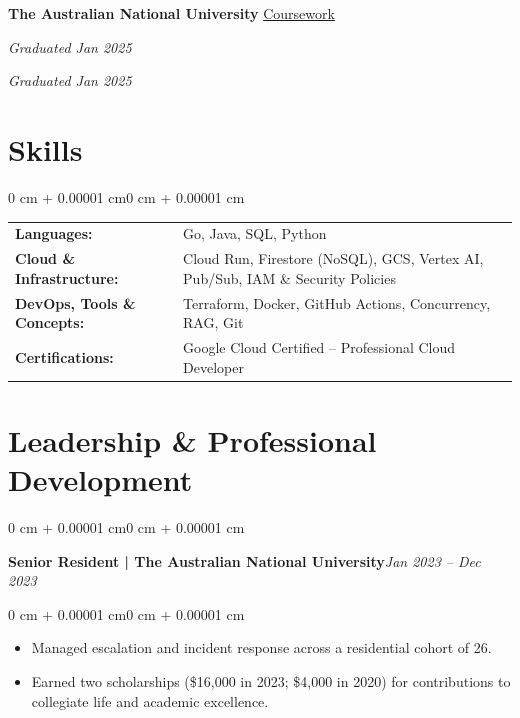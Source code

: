 \documentclass[10pt, letterpaper]{article}
\newenvironment{highlights}{
    \begin{itemize}[
        topsep=0.10 cm,
        parsep=0.10 cm,
        partopsep=0pt,
        itemsep=0pt,
        leftmargin=0 cm + 10pt
    ]
}{
    \end{itemize}
}
\newenvironment{onecolentry}{
    \begin{adjustwidth}{0 cm + 0.00001 cm}{0 cm + 0.00001 cm}
}{
    \end{adjustwidth}
}
\let\hrefWithoutArrow\href
\begin{document}
\textbf{The Australian National University}\hfill{} \hrefWithoutArrow{https://gitlab.com/llllllllleong/my-individual-works}{Coursework}%


\vspace{0.1cm}

\hspace{0.5cm}{Bachelor of Actuarial Studies}\hfill{} \textit{Graduated Jan 2025}

\vspace{0.1cm}

\hspace{0.5cm}{Bachelor of Finance (Quantitative Finance)}\hfill{} \textit{Graduated Jan 2025}

\section{Skills}
\vspace{0.1cm}

\begin{onecolentry}
    \begin{tabularx}{\linewidth}{@{} l X @{}}
        \textbf{Languages:}           & Go, Java, SQL, Python \\[0.2cm]
        \textbf{Cloud \& Infrastructure:} & Cloud Run, Firestore (NoSQL), GCS, Vertex AI, Pub/Sub, IAM \& Security Policies \\[0.2cm]
        \textbf{DevOps, Tools \& Concepts:}     & Terraform, Docker, GitHub Actions, Concurrency, RAG, Git  \\[0.2cm]
        \textbf{Certifications:}      & Google Cloud Certified – Professional Cloud Developer      \\[0.2cm]
    \end{tabularx}
\end{onecolentry}

\section{Leadership \& Professional Development}
\vspace{0.1cm}

\begin{onecolentry}
    \textbf{Senior Resident | The Australian National University}\hfill \textit{Jan 2023 – Dec 2023}
\end{onecolentry}

\vspace{0.10 cm}

\begin{onecolentry}
    \begin{highlights}
        \item Managed escalation and incident response across a residential cohort of 26.
        \item Earned two scholarships (\$16,000 in 2023; \$4,000 in 2020) for contributions to collegiate life and academic excellence.
    \end{highlights}
\end{onecolentry}
\end{document}
